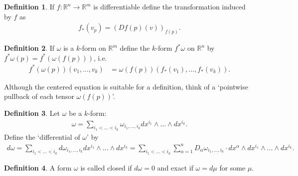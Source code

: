 \documentclass[20pt]{article}
\theoremstyle{plain}
\theoremstyle{definition}
\newtheorem{definition}{Definition}
\newcommand{\reals}{\mathbb{R}}
\begin{document}
  \begin{definition}
    If $f: \reals^n \to \reals^m$ is differentiable define the transformation induced by $f$ as
    \begin{align*}
      f_*(v_p) = (Df(p)(v))_{f(p)}.
    \end{align*}
  \end{definition}

  \begin{definition}
    If $\omega$ is a $k$-form on $\reals^m$ define the $k$-form $f^*\omega$ on $\reals^n$ by 
     $f^*\omega(p) = f^*(\omega(f(p)))$, i.e.
    \begin{align*}
     f^*(\omega(p))(v_1, ..., v_k) &= \omega(f(p))(f_*(v_1), ..., f_*(v_k)).      
    \end{align*} 
  \end{definition}
  \color{Blue}
  Although the centered equation is suitable for a definition, think of a 
  `pointwise pullback of each tensor $\omega (f(p))$'.
  \color{Black}




  \begin{definition}
    Let $\omega$ be a $k$-form:
    \begin{align*}
      \omega = \sum_{i_1 < ... < i_k} \omega_{i_1,...,i_k}dx^{i_1} \wedge ... \wedge dx^{i_k}.
    \end{align*}
    Define the `differential of $\omega$' by 
    \begin{align*}
      d\omega = 
      \sum_{i_1 < ... < i_k} d\omega_{i_1,...,i_k}dx^{i_1} \wedge ... \wedge dx^{i_k} = 
      \sum_{i_1 < ... < i_k} \sum_{\alpha = 1}^n D_\alpha \omega_{i_1,...,i_k}  \cdot dx^\alpha \wedge dx^{i_1}\wedge ... \wedge dx^{i_k}.
    \end{align*}
  \end{definition}


\begin{definition}
  A form $\omega$ is called closed if $d\omega = 0$ and exact if $\omega = d\mu$ for some $\mu. $
\end{definition} 




 



 



 



 
\end{document}
